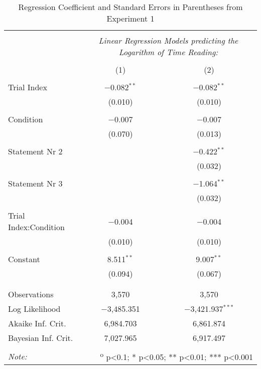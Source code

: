 
\begin{table} \centering
  \small
  \caption{Regression Coefficient and Standard Errors in Parentheses from Experiment 1}
  \label{table:read}
  \renewcommand{\arraystretch}{0.6}
\begin{tabular}{@{\extracolsep{5pt}}lcc}
\\[-1.8ex]\hline
\hline \\[-1.8ex]
 & \multicolumn{2}{c}{\textit{Linear Regression Models predicting the Logarithm of Time Reading:}} \\
\cline{2-3}
\\[-1.8ex] & (1) & (2)\\
\hline \\[-1.8ex]
 Trial Index & $-$0.082$^{**}$ & $-$0.082$^{**}$ \\
  & (0.010) & (0.010) \\
  & & \\
 Condition & $-$0.007 & $-$0.007 \\
  & (0.070) & (0.013) \\
  & & \\
 Statement Nr 2 &  & $-$0.422$^{**}$ \\
  &  & (0.032) \\
  & & \\
 Statement Nr 3 &  & $-$1.064$^{**}$ \\
  &  & (0.032) \\
  & & \\
 Trial Index:Condition & $-$0.004 & $-$0.004 \\
  & (0.010) & (0.010) \\
  & & \\
 Constant & 8.511$^{**}$ & 9.007$^{**}$ \\
  & (0.094) & (0.067) \\
  & & \\
\hline \\[-1.8ex]
Observations & 3,570 & 3,570 \\
Log Likelihood & $-$3,485.351 & $-$3,421.937$^{***}$ \\
Akaike Inf. Crit. & 6,984.703 & 6,861.874 \\
Bayesian Inf. Crit. & 7,027.965 & 6,917.497 \\
\hline
\hline \\[-1.8ex]
\textit{Note:}  & \multicolumn{2}{r}{	\textsuperscript{o} p<0.1; * p<0.05; ** p<0.01; *** p<0.001} \\
\end{tabular}
\end{table}
